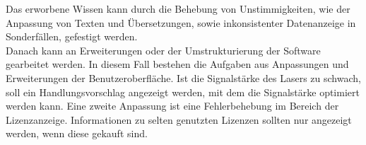Das erworbene Wissen kann durch die Behebung von Unstimmigkeiten, wie der Anpassung von Texten und Übersetzungen, sowie inkonsistenter Datenanzeige in Sonderfällen, gefestigt werden.\\
Danach kann an Erweiterungen oder der Umstrukturierung der Software gearbeitet werden. In diesem Fall bestehen die Aufgaben aus Anpassungen und Erweiterungen der Benutzeroberfläche. Ist die Signalstärke des Lasers zu schwach, soll ein Handlungsvorschlag angezeigt werden, mit dem die Signalstärke optimiert werden kann. Eine zweite Anpassung ist eine Fehlerbehebung im Bereich der Lizenzanzeige. Informationen zu selten genutzten Lizenzen sollten nur angezeigt werden, wenn diese gekauft sind. 